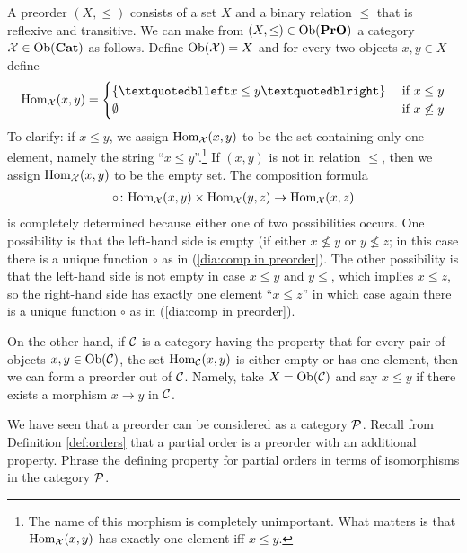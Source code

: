 \documentclass[CT4S-EN-RU]{subfiles}
\begin{document}
\begin{blockENG}
A preorder $(X,\leq)$ consists of a set $X$ and a binary relation $\leq$ that is reflexive and transitive. We can make from $(X,\leq)\in\textnormal{Ob}({\mathbf{PrO}})$ a category $\mathcal{X}\in\textnormal{Ob}({\mathbf{Cat}})$ as follows. Define $\textnormal{Ob}(\mathcal{X})=X$ and for every two objects $x,y\in X$ define
$$\Hom_\mcX(x,y)=\begin{cases}\{“x\leq y”\}&\tn{ if } x\leq y\\\emptyset&\tn{ if } x\not\leq y\end{cases}$$
To clarify: if $x\leq y$, we assign $\textnormal{Hom}_\mathcal{X}(x,y)$ to be the set containing only one element, namely the string “$x\leq y$”.\footnote{The name of this morphism is completely unimportant. What matters is that $\textnormal{Hom}_\mathcal{X}(x,y)$ has exactly one element iff $x\leq y$.} If $(x,y)$ is not in relation $\leq$, then we assign $\textnormal{Hom}_\mathcal{X}(x,y)$ to be the empty set. The composition formula 
\begin{align}\label{dia:comp in preorder}
\circ\colon\textnormal{Hom}_\mathcal{X}(x,y)\times\textnormal{Hom}_\mathcal{X}(y,z)\rightarrow\textnormal{Hom}_\mathcal{X}(x,z)
\end{align}
is completely determined because either one of two possibilities occurs. One possibility is that the left-hand side is empty (if either $x\not\leq y$ or $y\not\leq z$; in this case there is a unique function $\circ$ as in (\ref{dia:comp in preorder}). The other possibility is that the left-hand side is not empty in case $x\leq y$ and $y\leq$, which implies $x\leq z$, so the right-hand side has exactly one element $“x\leq z”$ in which case again there is a unique function $\circ$ as in (\ref{dia:comp in preorder}).
\end{blockENG}

\begin{blockRUS}
\end{blockRUS}

\begin{blockENG}
On the other hand, if $\mathcal{C}$ is a category having the property that for every pair of objects $x,y\in\textnormal{Ob}(\mathcal{C})$, the set $\textnormal{Hom}_\mathcal{C}(x,y)$ is either empty or has one element, then we can form a preorder out of $\mathcal{C}$. Namely, take $X=\textnormal{Ob}(\mathcal{C})$ and say $x\leq y$ if there exists a morphism $x\to y$ in $\mathcal{C}$. 
\end{blockENG}

\begin{blockRUS}
\end{blockRUS}

\begin{exerciseENG}
We have seen that a preorder can be considered as a category $\mathcal{P}$. Recall from Definition \ref{def:orders} that a partial order is a preorder with an additional property. Phrase the defining property for partial orders in terms of isomorphisms in the category $\mathcal{P}$.
\end{exerciseENG}
\end{document}
